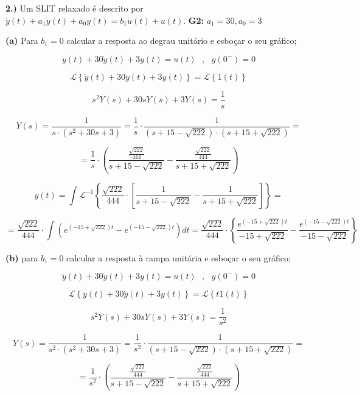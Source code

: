 \documentclass{article}
\begin{document}
\textbf{2.)} Um SLIT relaxado é descrito por $\ddot{y}(t) + a_1\dot{y}(t) + a_0y(t) = b_1\dot{u}(t) + u(t)$.
\textbf{G2:} $a_1 = 30, a_0 = 3$

\textbf{(a)} Para $b_1 = 0$ calcular a resposta ao degrau unitário e esboçar o seu gráfico;

\vspace{\baselineskip}

\[\ddot{y}(t) + 30\dot{y}(t) + 3y(t) = u(t)\,\,\,\,,\,\,\,\,y(0^{-}) = 0\]

\[\mathcal{L} \left\{\ddot{y}(t) + 30\dot{y}(t) + 3y(t)\right\} = \mathcal{L} \left\{1(t)\right\}\]

\[ s^{2}Y(s) + 30sY(s) + 3Y(s) = \frac{1}{s} \]

\[ Y(s) = \frac{1}{s \cdot (s^{2} + 30s + 3)} = \frac{1}{s} \cdot \frac{1}{(s + 15 - \sqrt{222}) \cdot (s + 15 + \sqrt{222})} =\]

\[ = \frac{1}{s} \cdot \left(\frac{ \frac{\sqrt{222}}{444}}{s + 15 - \sqrt{222}} - \frac{\frac{\sqrt{222}}{444}}{s + 15 + \sqrt{222}}\right) \]

\[ y(t) = \int \mathcal{L}^{-1} \left\{\frac{\sqrt{222}}{444} \cdot \left[ \frac{1}{s + 15 - \sqrt{222}} - \frac{1}{s + 15 + \sqrt{222}} \right] \right\} = \]

\[ = \frac{\sqrt{222}}{444} \cdot \int (e^{(-15+\sqrt{222})t} - e^{(-15-\sqrt{222})t}) dt = \frac{\sqrt{222}}{444} \cdot \left\{ \frac{e^{(-15+\sqrt{222})t}}{-15+\sqrt{222}} - \frac{e^{(-15-\sqrt{222})t}}{-15-\sqrt{222}} \right\}  \]

\vspace{\baselineskip}

\textbf{(b)} para $b_1 = 0$ calcular a resposta à rampa unitária e esboçar o seu gráfico;

\vspace{\baselineskip}

\[\ddot{y}(t) + 30\dot{y}(t) + 3y(t) = u(t)\,\,\,\,,\,\,\,\,y(0^{-}) = 0\]

\[\mathcal{L} \left\{\ddot{y}(t) + 30\dot{y}(t) + 3y(t)\right\} = \mathcal{L} \left\{t1(t)\right\}\]

\[ s^{2}Y(s) + 30sY(s) + 3Y(s) = \frac{1}{s^{2}} \]

\[ Y(s) = \frac{1}{s^{2} \cdot (s^{2} + 30s + 3)} = \frac{1}{s^{2}} \cdot \frac{1}{(s + 15 - \sqrt{222}) \cdot (s + 15 + \sqrt{222})} =\]

\[ = \frac{1}{s^{2}} \cdot \left(\frac{ \frac{\sqrt{222}}{444}}{s + 15 - \sqrt{222}} - \frac{\frac{\sqrt{222}}{444}}{s + 15 + \sqrt{222}}\right) \]
\end{document}
